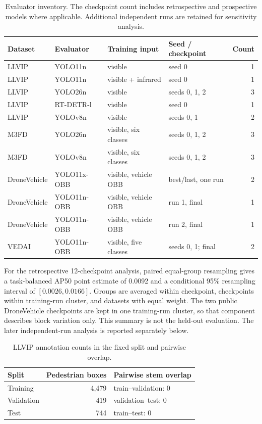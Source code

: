 \documentclass[11pt]{article}
\begin{document}
\begin{table}[h]
\centering
\small
\caption{Evaluator inventory. The checkpoint count includes retrospective and
prospective models where applicable. Additional independent runs are retained
for sensitivity analysis.}
\label{tab:supp-evaluators}
\begin{tabular}{@{}llllr@{}}
\toprule
Dataset & Evaluator & Training input & Seed / checkpoint & Count \\
\midrule
LLVIP & YOLO11n & visible & seed 0 & 1 \\
LLVIP & YOLO11n & visible + infrared & seed 0 & 1 \\
LLVIP & YOLO26n & visible & seeds 0, 1, 2 & 3 \\
LLVIP & RT-DETR-l & visible & seed 0 & 1 \\
LLVIP & YOLOv8n & visible & seeds 0, 1 & 2 \\
M3FD & YOLO26n & visible, six classes & seeds 0, 1, 2 & 3 \\
M3FD & YOLOv8n & visible, six classes & seeds 0, 1, 2 & 3 \\
DroneVehicle & YOLO11x-OBB & visible, vehicle OBB & best/last, one run & 2 \\
DroneVehicle & YOLO11n-OBB & visible, vehicle OBB & run 1, final & 1 \\
DroneVehicle & YOLO11n-OBB & visible, vehicle OBB & run 2, final & 1 \\
VEDAI & YOLO11n-OBB & visible, five classes & seeds 0, 1; final & 2 \\
\bottomrule
\end{tabular}
\end{table}

For the retrospective 12-checkpoint analysis, paired equal-group resampling
gives a task-balanced AP50 point estimate of 0.0092 and a conditional 95\%
resampling interval of \([0.0026,0.0166]\). Groups are averaged within
checkpoint, checkpoints within training-run cluster, and datasets with equal
weight. The two public DroneVehicle checkpoints are kept in one training-run
cluster, so that component describes block variation only. This summary is not
the held-out evaluation. The later independent-run analysis is reported
separately below.

\begin{table}[h]
\centering
\small
\caption{LLVIP annotation counts in the fixed split and pairwise overlap.}
\begin{tabular}{@{}lrl@{}}
\toprule
Split & Pedestrian boxes & Pairwise stem overlap \\
\midrule
Training & 4,479 & train--validation: 0 \\
Validation & 419 & validation--test: 0 \\
Test & 744 & train--test: 0 \\
\bottomrule
\end{tabular}
\end{table}
\end{document}
